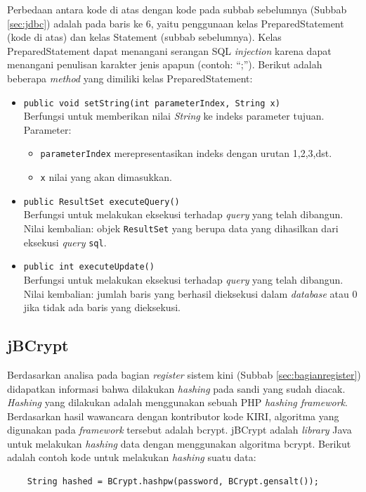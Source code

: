 Perbedaan antara kode di atas dengan kode pada subbab sebelumnya (Subbab \ref{sec:jdbc}) adalah pada baris ke 6, yaitu penggunaan kelas PreparedStatement (kode di atas) dan kelas Statement (subbab sebelumnya). Kelas PreparedStatement dapat menangani serangan SQL \textit{injection} karena dapat menangani penulisan karakter jenis apapun (contoh: ``;''). Berikut adalah beberapa \textit{method} yang dimiliki kelas PreparedStatement:
\begin{itemize}
	\item \texttt{public void setString(int parameterIndex, String x)}\\
		Berfungsi untuk memberikan nilai \textit{String} ke indeks parameter tujuan.\\
		Parameter:
		\begin{itemize}
			\item \texttt{parameterIndex} merepresentasikan indeks dengan urutan 1,2,3,dst.
			\item \texttt{x} nilai yang akan dimasukkan.
		\end{itemize}
	\item \texttt{public ResultSet executeQuery()}\\
		Berfungsi untuk melakukan eksekusi terhadap \textit{query} yang telah dibangun.\\
		Nilai kembalian: objek \texttt{ResultSet} yang berupa data yang dihasilkan dari eksekusi \textit{query} \texttt{sql}.
	\item \texttt{public int executeUpdate()}\\
		Berfungsi untuk melakukan eksekusi terhadap \textit{query} yang telah dibangun.\\
		Nilai kembalian: jumlah baris yang berhasil dieksekusi dalam \textit{database} atau 0 jika tidak ada baris yang dieksekusi.
\end{itemize}

\subsection{jBCrypt}
\label{sec:jbcrypt}
Berdasarkan analisa pada bagian \textit{register} sistem kini (Subbab \ref{sec:bagianregister}) didapatkan informasi bahwa dilakukan \textit{hashing} pada sandi yang sudah diacak. \textit{Hashing} yang dilakukan adalah menggunakan sebuah PHP \textit{hashing framework}\cite{openwall}. Berdasarkan hasil wawancara dengan kontributor kode KIRI, algoritma yang digunakan pada \textit{framework} tersebut adalah bcrypt. jBCrypt adalah \textit{library} Java untuk melakukan \textit{hashing} data dengan menggunakan algoritma bcrypt\cite{jbcrypt}. Berikut adalah contoh kode untuk melakukan \textit{hashing} suatu data:
\begin{lstlisting}
	String hashed = BCrypt.hashpw(password, BCrypt.gensalt());
\end{lstlisting}

